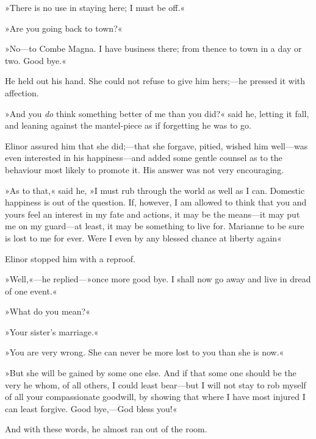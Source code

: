 »There is no use in staying here; I must be off.«

»Are you going back to town?«

»No—to Combe Magna. I have business there; from thence to town in a day or two. Good bye.«

He held out his hand. She could not refuse to give him hers;—he pressed it with affection.

»And you \textit{do} think something better of me than you did?« said he, letting it fall, and leaning against the mantel-piece as if forgetting he was to go.

Elinor assured him that she did;—that she forgave, pitied, wished him well—was even interested in his happiness—and added some gentle counsel as to the behaviour most likely to promote it. His answer was not very encouraging.

»As to that,« said he, »I must rub through the world as well as I can. Domestic happiness is out of the question. If, however, I am allowed to think that you and yours feel an interest in my fate and actions, it may be the means—it may put me on my guard—at least, it may be something to live for. Marianne to be sure is lost to me for ever. Were I even by any blessed chance at liberty again\longdash«

Elinor stopped him with a reproof.

»Well,«—he replied—»once more good bye. I shall now go away and live in dread of one event.«

»What do you mean?«

»Your sister’s marriage.«

»You are very wrong. She can never be more lost to you than she is now.«

»But she will be gained by some one else. And if that some one should be the very he whom, of all others, I could least bear—but I will not stay to rob myself of all your compassionate goodwill, by showing that where I have most injured I can least forgive. Good bye,—God bless you!«

And with these words, he almost ran out of the room.